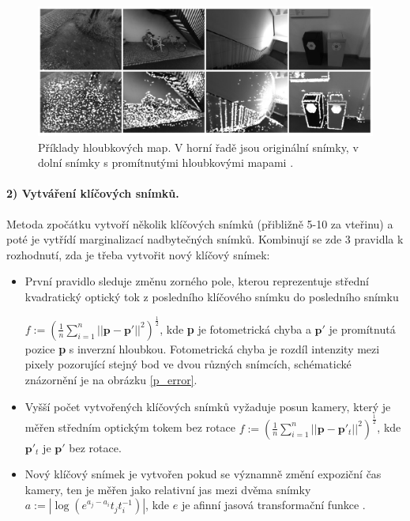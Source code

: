 \documentclass[12pt,a4paper]{report}
\begin{document}
\begin{figure}[H]
\centering
\includegraphics[scale=0.60]{img/Obr5_b.png}
\caption{Příklady hloubkových map. V horní řadě jsou originální snímky, v dolní snímky s promítnutými hloubkovými mapami \cite{Engel2018_DSO}.}
\label{7}
\end{figure}

\paragraph*{2) Vytváření klíčových snímků.} Metoda zpočátku vytvoří několik klíčových snímků (přibližně 5-10 za vteřinu) a poté je vytřídí marginalizací nadbytečných snímků. Kombinují se zde 3 pravidla k rozhodnutí, zda je třeba vytvořit nový klíčový snímek:
\begin{itemize}
\item První pravidlo sleduje změnu zorného pole, kterou reprezentuje střední kvadratický optický tok z posledního klíčového snímku do posledního snímku
 
\( f:=(\frac{1}{n}\sum_{i=1}^n||\textbf{p}-\textbf{p}'||^2)^\frac{1}{2} \), kde \textbf{p} je fotometrická chyba a \(\textbf{p}'\) je promítnutá pozice \textbf{p} s inverzní hloubkou. Fotometrická chyba je rozdíl intenzity mezi pixely pozorující stejný bod ve dvou různých snímcích, schématické znázornění je na obrázku \ref{p_error}.

\item Vyšší počet vytvořených klíčových snímků vyžaduje posun kamery, který je měřen středním optickým tokem bez rotace \( f:=(\frac{1}{n}\sum_{i=1}^n||\textbf{p}-\textbf{p}'_t||^2)^\frac{1}{2} \), kde \(\textbf{p}'_t\) je \(\textbf{p}'\) bez rotace.

\item Nový klíčový snímek je vytvořen pokud se významně změní expoziční čas kamery, ten je měřen jako relativní jas mezi dvěma snímky \( a:=|\log(e^{a_j-a_i} t_j t_i^{-1})| \), kde \( e \) je afinní jasová transformační funkce \cite{Engel2018_DSO}.
\end{itemize}
\end{document}
